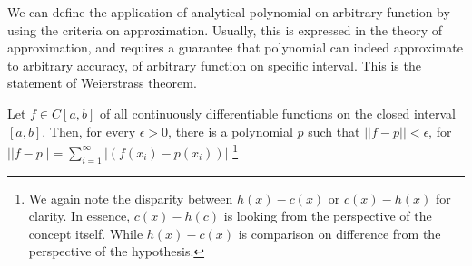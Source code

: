 \documentclass[
  journal=largetwo,
  year=2025,
  volume=37,
]{cup-journal}
\begin{document}
We can define the application of analytical polynomial on arbitrary function by using the criteria on approximation. Usually, this is expressed in the theory of approximation, and requires a guarantee that polynomial can indeed approximate to arbitrary accuracy, of arbitrary function on specific interval. This is the statement of Weierstrass theorem. 

\begin{theorem}\label{thm:Weierstrass_AT}
    Let $f\in C[a,b]$ of all continuously differentiable functions on the closed interval $[a,b]$. Then, for every $\epsilon > 0$, there is a polynomial $p$ such that $||f-p||< \epsilon$, for $||f-p||=\sum_{i=1}^{\infty}|(f(x_{i})-p(x_{i}))|$ \footnote{We again note the disparity between $h(x)-c(x)$ or $c(x)-h(x)$ for clarity. In essence, $c(x)-h(c)$ is looking from the perspective of the concept itself. While $h(x)-c(x)$ is comparison on difference from the perspective of the hypothesis.}
\end{theorem}
\end{document}
